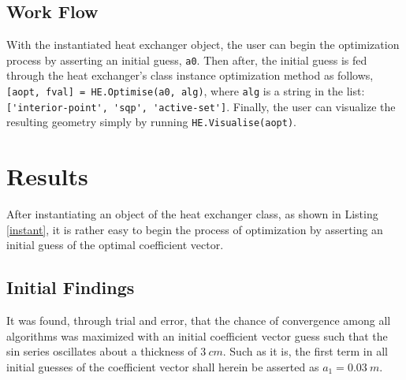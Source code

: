 \documentclass{article}
\begin{document}
\subsection{Work Flow}
With the instantiated heat exchanger object, the user can begin the optimization process by asserting an initial guess, \lstinline[]{a0}. Then after, the initial guess is fed through the heat exchanger's class instance optimization method as follows, \lstinline[]{[aopt, fval] = HE.Optimise(a0, alg)}, where \lstinline[]{alg} is a string in the list: \lstinline[]{['interior-point', 'sqp', 'active-set']}. Finally, the user can visualize the resulting geometry simply by running \lstinline[]{HE.Visualise(aopt)}.

\section{Results}
After instantiating an object of the heat exchanger class, as shown in Listing \ref{instant}, it is rather easy to begin the process of optimization by asserting an initial guess of the optimal coefficient vector. 

\subsection{Initial Findings}It was found, through trial and error, that the chance of convergence among all algorithms was maximized with an initial coefficient vector guess such that the sin series oscillates about a thickness of $3~cm$. Such as it is, the first term in all initial guesses of the coefficient vector shall herein be asserted as $a_1 = 0.03~m$.
\end{document}
